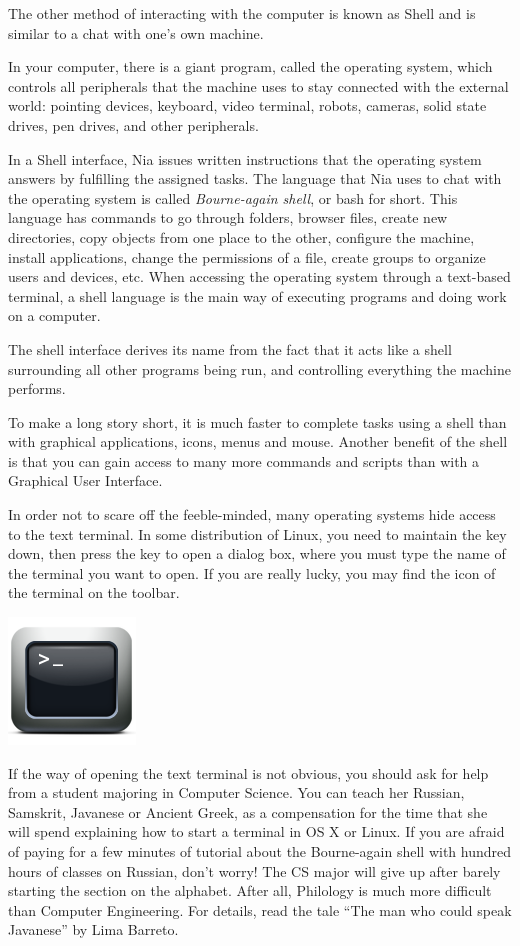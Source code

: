 \documentclass[a4paper,12pt]{book}
\begin{document}
The other method of interacting with
the computer is known as Shell and is similar to
a chat with one's own machine.

In your computer, there is a giant
program, called the operating system, which controls
all peripherals that the machine uses to
stay connected with the external world:
pointing devices,  keyboard,
video terminal, robots, cameras, solid
state drives, pen drives, and other peripherals.

In a Shell interface, Nia issues written instructions
that the operating system answers by fulfilling the
assigned tasks. The language that Nia
uses to chat with the operating
system is called {\em Bourne-again shell}, or
bash for short. This language has
commands to go through folders, browser
files, create new directories, copy
objects from one place to the other,
configure the machine, install
applications, change the permissions
of a file, create groups to organize
users and devices, etc.
When accessing the operating system through
a text-based terminal, a shell language is the main way
of executing programs and doing work on a computer.

The shell interface derives its name from
the fact that it acts like a shell
surrounding all other programs being run,
and controlling everything the machine performs.

To make a long story short,
it is much faster to complete tasks
using a shell than with graphical applications,
icons, menus and mouse. Another benefit of the
shell is that you can gain access to many
more commands and scripts than with
a Graphical User Interface.

In order not to scare off the feeble-minded,
many operating systems hide access
to the text terminal. In some distribution
of Linux, you need to maintain the  key
down, then press the  key to open a
dialog box, where you must type the
name of the terminal you want to open.
If you are really lucky, you may find
the icon of the terminal  on the
toolbar.

\includegraphics[scale=0.8]{figs/terminal.png}

If the way of opening the text terminal
is not obvious, you should ask for help
from a student majoring in Computer Science.
You can teach her Russian, Samskrit, Javanese
or Ancient Greek, as a compensation
for the time that she will spend explaining
how to start a terminal in 
OS X or Linux. If you are afraid
of paying for a few minutes of tutorial
about the Bourne-again shell
with hundred hours of classes on
Russian, don't worry! The CS
major will give up after barely
starting the section on the alphabet. After all,
Philology is much more difficult
than Computer Engineering.
For details, read the tale ``The man who could speak
Javanese'' by Lima Barreto.
\end{document}

